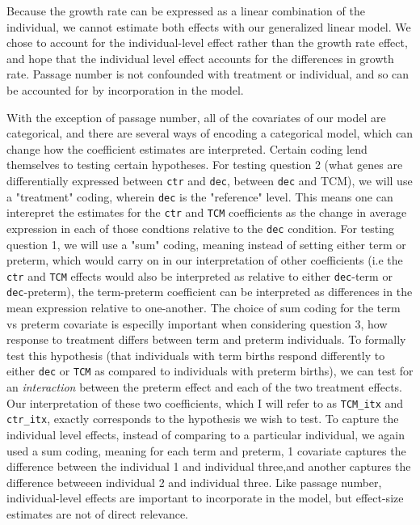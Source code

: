 \begin{itemize}
Because the growth rate can be expressed as a linear combination of the individual, we cannot estimate both effects with our generalized linear model.  We chose to account for the individual-level effect rather
than the growth rate effect, and hope that the individual level effect accounts for the differences in growth rate. Passage number is not confounded with treatment or individual, and so can be accounted for by incorporation
in the model.


With the exception of passage number, all of the covariates of our model are categorical, and there are several ways of encoding a categorical model, which can change how the coefficient estimates are interpreted.
Certain coding lend themselves to testing certain hypotheses.  For testing question 2 (what genes are differentially expressed between \texttt{ctr} and \texttt{dec}, between \texttt{dec} and TCM), we will use a "treatment" coding,
wherein \texttt{dec} is the "reference" level.  This means one can interepret the estimates for the \texttt{ctr} and \texttt{TCM} coefficients as the change in average expression in each of those condtions relative to the \texttt{dec} condition.
For testing question 1, we will use a "sum" coding, meaning instead of setting either term or preterm, which would carry on in our interpretation of other coefficients (i.e the \texttt{ctr} and \texttt{TCM} effects would also be 
interpreted as relative to either \texttt{dec}-term or \texttt{dec}-preterm), the term-preterm coefficient can be interpreted as differences in the mean expression relative to one-another.  The choice of sum coding for the term vs preterm covariate 
is especilly important when considering question 3, how response to treatment differs between term and preterm individuals.  To formally test this hypothesis (that individuals with term births respond differently to either \texttt{dec} or \texttt{TCM} as compared to 
individuals with preterm births), we can test for an \emph{interaction} between the preterm effect and each of the two treatment effects.  Our interpretation of these two coefficients, which I will refer to as \texttt{TCM\_itx} and \texttt{ctr\_itx},
exactly corresponds to the hypothesis we wish to test.  To capture the individual level effects, instead of comparing to a particular individual, we again used a sum coding, meaning for each term and preterm, 
1 covariate captures the difference between the individual 1 and individual three,and another captures the difference betweeen individual 2 and individual three.  Like passage number, individual-level effects are important to
incorporate in the model, but effect-size estimates are not of direct relevance.


\end{itemize}
